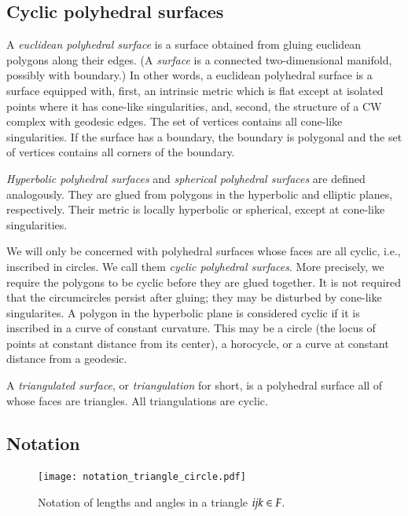 \documentclass[Thesis]{subfiles}
\begin{document}
\subsection{Cyclic polyhedral surfaces }

A \emph{euclidean polyhedral surface} is a surface obtained from
gluing euclidean polygons along their edges. (A \emph{surface} is a
connected two-dimensional manifold, possibly with boundary.)  In other
words, a euclidean polyhedral surface is a surface equipped with,
first, an intrinsic metric which is flat except at isolated points
where it has cone-like singularities, and, second, the structure of a
CW complex with geodesic edges. The set of vertices contains all
cone-like singularities. If the surface has a boundary, the boundary
is polygonal and the set of vertices contains all corners of the
boundary.

\emph{Hyperbolic polyhedral surfaces} and \emph{spherical polyhedral
surfaces} are defined analogously. They are glued from polygons in
the hyperbolic and elliptic planes, respectively. Their metric is
locally hyperbolic or spherical, except at cone-like singularities.

We will only be concerned with polyhedral surfaces whose faces are all
cyclic, i.e., inscribed in circles. We call them \emph{cyclic
polyhedral surfaces}. More precisely, we require the polygons to be
cyclic before they are glued together. It is not required that the
circumcircles persist after gluing; they may be disturbed by cone-like
singularites. A polygon in the hyperbolic plane is considered cyclic
if it is inscribed in a curve of constant curvature. This may be a
circle (the locus of points at constant distance from its center), a
horocycle, or a curve at constant distance from a geodesic.

A \emph{triangulated surface}, or \emph{triangulation} for short, is a
polyhedral surface all of whose faces are triangles.  All
triangulations are cyclic.

\subsection{Notation}
\label{sec:notation}

\begin{figure}
\centering
\texttt{[image: notation\_triangle\_circle.pdf]}\\
\vspace{0.2cm}
\caption{Notation of lengths and angles in a triangle $\it ijk \in F$.}
\label{fig:triangle_notation}	
\end{figure}
\end{document}
